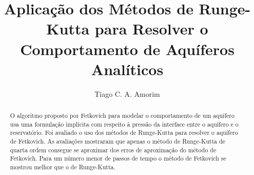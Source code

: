 \documentclass[final,5p]{elsarticle}
\numberwithin{equation}{section}
\begin{document}
\begin{frontmatter}



\title{Aplicação dos Métodos de Runge-Kutta para Resolver o Comportamento de Aquíferos Analíticos}


\author{Tiago C. A. Amorim}

\begin{abstract}

    O algoritmo proposto por Fetkovich para modelar o comportamento de um aquífero usa uma formulação implícita com respeito à pressão da interface entre o aquífero e o reservatório. Foi avaliado o uso dos métodos de Runge-Kutta para resolver o aquífero de Fetkovich. As avaliações mostraram que apenas o método de Runge-Kutta de quarta ordem consegue se aproximar dos erros de aproximação do método de Fetkovich. Para um número menor de passos de tempo o método de Fetkovich se mostrou melhor que o de Runge-Kutta.


\end{abstract}
\end{frontmatter}
\end{document}
